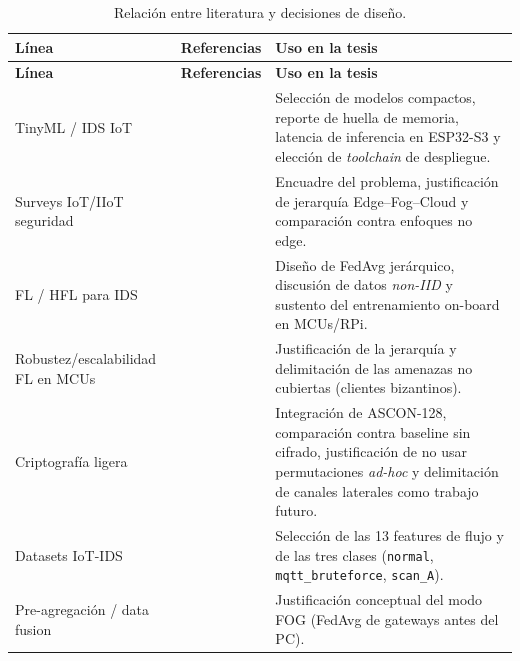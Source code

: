 \begin{longtable}{@{}p{} p{} p{}@{}}
\caption{Relación entre literatura y decisiones de diseño.}
\label{tab:literatura_diseno}\\
\toprule
\textbf{Línea} & \textbf{Referencias} & \textbf{Uso en la tesis} \\
\midrule
\endfirsthead
\toprule
\textbf{Línea} & \textbf{Referencias} & \textbf{Uso en la tesis} \\
\midrule
\endhead
TinyML / IDS IoT & \cite{Tekin2023_OnDeviceEnergy, Amuthadevi2025, Alwaisi2024, HeydariMahmoud2025_TinyML_IDS, Dini2024_EmbeddedIIoT_Review} & Selección de modelos compactos, reporte de huella de memoria, latencia de inferencia en ESP32-S3 y elección de \emph{toolchain} de despliegue. \\
Surveys IoT/IIoT seguridad & \cite{Amanullah2020_DL_BigData_IoT_Security, Ni2024_IIoT_Security_Survey, Bagaa2020_ML_IoT_Framework, Huda2018_DBN_SCADA} & Encuadre del problema, justificación de jerarquía Edge--Fog--Cloud y comparación contra enfoques no edge. \\
FL / HFL para IDS & \cite{McMahan2017FedAvg, Imteaj2022_FL_ResourceConstrainedSurvey, Albanbay2025, Ramadan2025, Hajj2023_CrossLayerFL_IDS, Roy2023_FL_AdaptedModel, Chaurasia2024_FL_ResNet_IIoT, Ficco2024_FL_TinyML_Onboard} & Diseño de FedAvg jerárquico, discusión de datos \textit{non-IID} y sustento del entrenamiento on-board en MCUs/RPi. \\
Robustez/escalabilidad FL en MCUs & \cite{Tran2026_EdgeTrustShard} & Justificación de la jerarquía y delimitación de las amenazas no cubiertas (clientes bizantinos). \\
Criptografía ligera & \cite{NISTSP8002322025, Gusita2025_LWC_Survey, Kaur2025_ASCON_Survey, Mirzaali2025_LWC_Permutations, NISTIR8454_2023} & Integración de ASCON-128, comparación contra baseline sin cifrado, justificación de no usar permutaciones \emph{ad-hoc} y delimitación de canales laterales como trabajo futuro. \\
Datasets IoT-IDS & \cite{Moustafa2020_TONIoT, Neto2023_CICIoT2023, Ferrag2022_EdgeIIoTset, Stratosphere_IoT23, Rani2024_IoT_IDS_Datasets, Raminenei2023_ML_IoT_UNSWNB15} & Selección de las 13 features de flujo y de las tres clases (\texttt{normal}, \texttt{mqtt\_bruteforce}, \texttt{scan\_A}). \\
Pre-agregación / data fusion & \cite{Wang2019_DataFusion_CPSS} & Justificación conceptual del modo FOG (FedAvg de gateways antes del PC). \\
\bottomrule
\end{longtable}

\newpage
